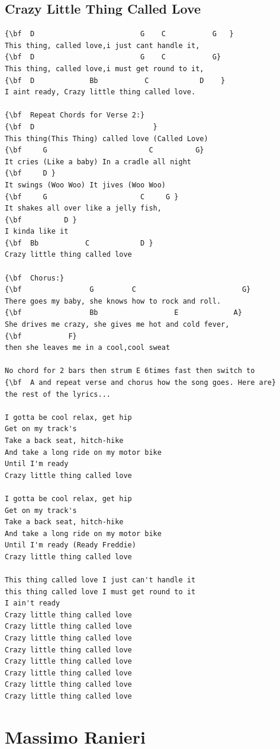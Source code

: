 \documentclass[a4paper]{article}
\begin{document}
\subsection{Crazy Little Thing Called Love}
\begin{Verbatim}[commandchars=\\\{\}]
{\bf  D                         G    C           G   }
This thing, called love,i just cant handle it,
{\bf  D                         G    C           G}
This thing, called love,i must get round to it,
{\bf  D             Bb           C            D    }
I aint ready, Crazy little thing called love.

{\bf  Repeat Chords for Verse 2:}
{\bf  D                            }
This thing(This Thing) called love (Called Love)
{\bf     G                        C          G}
It cries (Like a baby) In a cradle all night
{\bf     D }
It swings (Woo Woo) It jives (Woo Woo)
{\bf     G                      C     G }
It shakes all over like a jelly fish,
{\bf          D }
I kinda like it
{\bf  Bb           C            D }
Crazy little thing called love 

{\bf  Chorus:}
{\bf                G         C                         G}
There goes my baby, she knows how to rock and roll.
{\bf                Bb                  E             A}
She drives me crazy, she gives me hot and cold fever,
{\bf           F}
then she leaves me in a cool,cool sweat

No chord for 2 bars then strum E 6times fast then switch to
{\bf  A and repeat verse and chorus how the song goes. Here are}
the rest of the lyrics...

I gotta be cool relax, get hip 
Get on my track's 
Take a back seat, hitch-hike 
And take a long ride on my motor bike 
Until I'm ready 
Crazy little thing called love 

I gotta be cool relax, get hip 
Get on my track's 
Take a back seat, hitch-hike 
And take a long ride on my motor bike 
Until I'm ready (Ready Freddie) 
Crazy little thing called love 

This thing called love I just can't handle it 
this thing called love I must get round to it 
I ain't ready 
Crazy little thing called love 
Crazy little thing called love 
Crazy little thing called love 
Crazy little thing called love 
Crazy little thing called love 
Crazy little thing called love 
Crazy little thing called love 
Crazy little thing called love

\end{Verbatim}
\newpage
\section{Massimo Ranieri}
\end{document}
